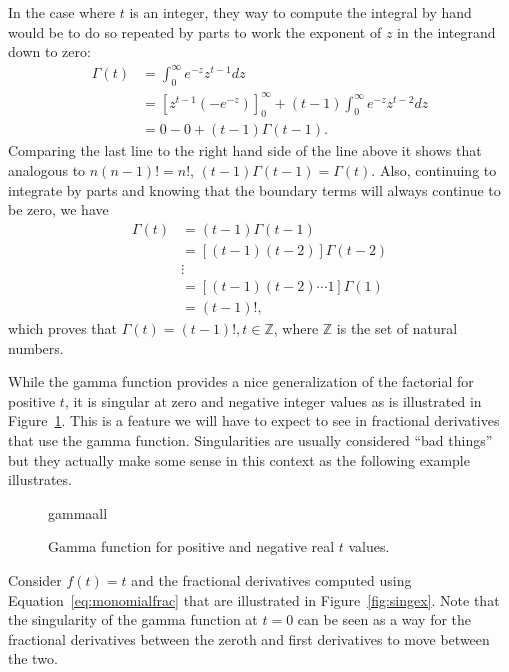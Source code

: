In the case where $t$ is an integer, they way to compute the integral by hand would be to do so repeated by parts to work the exponent of $z$ in the integrand down to zero:
\begin{align*}
 \Gamma(t) &= 
  \int_0^\infty e^{-z} z^{t-1} dz \\ &= \left[ z^{t-1} \left(- e^{-z} \right) \right]^\infty_0 + \left(t-1 \right) \int_0^\infty e^{-z} z^{t-2} dz \\
&= 0 - 0 + \left( t - 1 \right) \Gamma(t-1).
\end{align*}
Comparing the last line to the right hand side of the line above it shows that analogous to $n \left(n - 1 \right)! = n!$, $\boxed{ \left( t - 1 \right) \Gamma(t - 1) = \Gamma(t) }$. Also, continuing to integrate by parts and knowing that the boundary terms will always continue to be zero, we have
\begin{align*}
  \Gamma(t) &= \left( t - 1 \right) \Gamma \left( t - 1 \right) \\
  &= \left[ \left( t - 1 \right) \left( t - 2 \right) \right] \Gamma \left( t - 2 \right) \\
 & \vdots \\
 &= \left[ \left(t - 1 \right) \left( t - 2 \right) \cdots 1 \right] \Gamma(1) \\
 &= \left( t - 1 \right)!,
\end{align*}
which proves that $\boxed{ \Gamma(t) = (t-1)!, t \in \mathbb Z }$, where $\mathbb Z$ is the set of natural numbers.

While the gamma function provides a nice generalization of the factorial for positive $t$, it is singular at zero and negative integer values as is illustrated in Figure~\ref{fig:gammaall}. This is a feature we will have to expect to see in fractional derivatives that use the gamma function. Singularities are usually considered ``bad things'' but they actually make some sense in this context as the following example illustrates.

\begin{figure}
  \centering
  {gammaall}
  \caption{Gamma function for positive and negative real $t$ values.}
\label{fig:gammaall}
\end{figure}

\begin{example}
  Consider $f(t) = t$ and the fractional derivatives computed using Equation~\ref{eq:monomialfrac} that are illustrated in Figure~\ref{fig:singex}. Note that the singularity of the gamma function at $t=0$ can be seen as a way for the fractional derivatives between the zeroth and first derivatives to move between the two.
\end{example}

